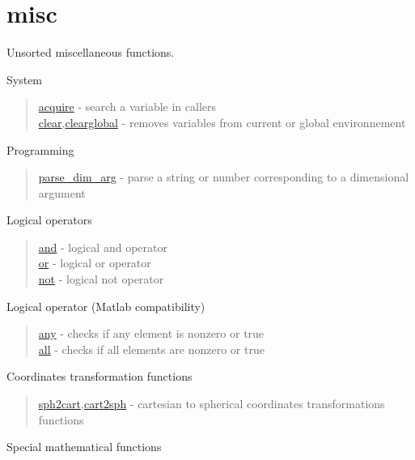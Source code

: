 \chapter*{misc}

Unsorted miscellaneous functions.

System

\begin{quote}
\noindent
\hyperlink{acquire}{acquire} - search a variable in callers  \\
\hyperlink{clear}{clear},\hyperlink{clearglobal}{clearglobal} - removes variables from current or global environnement  \\
\end{quote}


Programming

\begin{quote}
\noindent
\hyperlink{parse_dim_arg}{parse\_dim\_arg} - parse a string or number corresponding to a dimensional argument \\
\end{quote}


Logical operators

\begin{quote}
\noindent
\hyperlink{and}{and} - logical and operator \\
\hyperlink{or}{or} - logical or operator \\
\hyperlink{not}{not} - logical not operator \\
\end{quote}

Logical operator (Matlab compatibility)

\begin{quote}
\noindent
\hyperlink{any}{any} - checks if any element is nonzero or true  \\
\hyperlink{all}{all} - checks if all elements are nonzero or true \\
\end{quote}

Coordinates transformation functions

\begin{quote}
\noindent
\hyperlink{sph2cart}{sph2cart},\hyperlink{cart2sph}{cart2sph} -
cartesian to spherical coordinates transformations functions \\
\end{quote}


Special mathematical functions

